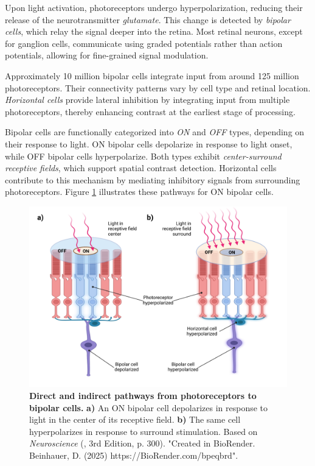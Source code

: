 Upon light activation, photoreceptors undergo hyperpolarization, reducing their release of the neurotransmitter \emph{glutamate}. This change is detected by \emph{bipolar cells}, which relay the signal deeper into the retina. Most retinal neurons, except for ganglion cells, communicate using graded potentials rather than action potentials, allowing for fine-grained signal modulation.

Approximately 10 million bipolar cells integrate input from around 125 million photoreceptors. Their connectivity patterns vary by cell type and retinal location. \emph{Horizontal cells} provide lateral inhibition by integrating input from multiple photoreceptors, thereby enhancing contrast at the earliest stage of processing.

Bipolar cells are functionally categorized into \emph{ON} and \emph{OFF} types, depending on their response to light. ON bipolar cells depolarize in response to light onset, while OFF bipolar cells hyperpolarize. Both types exhibit \emph{center-surround receptive fields}, which support spatial contrast detection. Horizontal cells contribute to this mechanism by mediating inhibitory signals from surrounding photoreceptors. Figure \ref{fig:on_off_cells} illustrates these pathways for ON bipolar cells.

\begin{figure}
    \centering
    \includegraphics[width=\linewidth]{img/on_off_cells.pdf}
    \caption{\textbf{Direct and indirect pathways from photoreceptors to bipolar cells.} \textbf{a)} An ON bipolar cell depolarizes in response to light in the center of its receptive field. \textbf{b)} The same cell hyperpolarizes in response to surround stimulation. Based on \emph{Neuroscience} (\citet{bear2020neuroscience}, 3rd Edition, p. 300). "Created in BioRender. Beinhauer, D. (2025) https://BioRender.com/bpeqbrd".}
    \label{fig:on_off_cells}
\end{figure}

